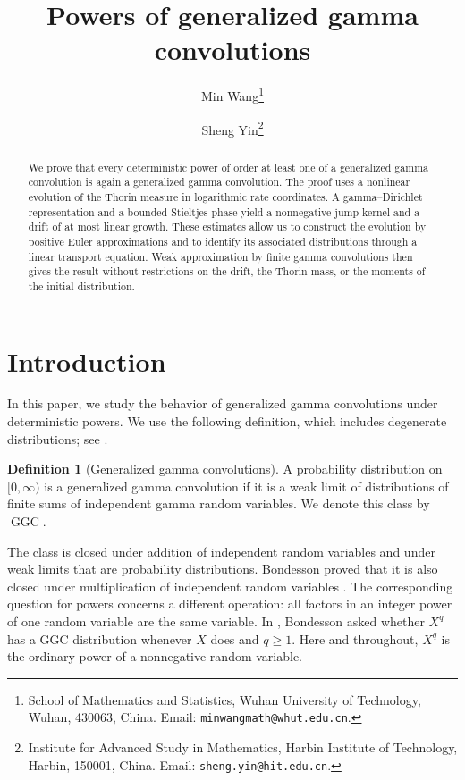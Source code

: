 \documentclass[11pt]{article}
\title{Powers of generalized gamma convolutions}
\author{Min Wang\thanks{School of Mathematics and Statistics, Wuhan University of Technology, Wuhan, 430063, China.
Email: \texttt{minwangmath@whut.edu.cn}.}
\and Sheng Yin\thanks{Institute for Advanced Study in Mathematics, Harbin Institute of Technology, Harbin, 150001, China.
Email: \texttt{sheng.yin@hit.edu.cn}.}}
\theoremstyle{definition}
\newtheorem{definition}{Definition}
\theoremstyle{remark}
\newcommand{\GGC}{\operatorname{GGC}}
\begin{document}
\maketitle

\begin{abstract}
We prove that every deterministic power of order at least one of a generalized gamma convolution is again a generalized gamma convolution.
The proof uses a nonlinear evolution of the Thorin measure in logarithmic rate coordinates.
A gamma--Dirichlet representation and a bounded Stieltjes phase yield a nonnegative jump kernel and a drift of at most linear growth.
These estimates allow us to construct the evolution by positive Euler approximations and to identify its associated distributions through a linear transport equation.
Weak approximation by finite gamma convolutions then gives the result without restrictions on the drift, the Thorin mass, or the moments of the initial distribution.
\end{abstract}

\section{Introduction}
\label{sec:introduction}

In this paper, we study the behavior of generalized gamma convolutions under deterministic powers.
We use the following definition, which includes degenerate distributions; see \cite[Section~3.1]{Bondesson1992}.

\begin{definition}[Generalized gamma convolutions]
\label{def:ggc}
A probability distribution on $[0,\infty)$ is a generalized gamma convolution if it is a weak limit of distributions of finite sums of independent gamma random variables.
We denote this class by $\GGC$.
\end{definition}

The class is closed under addition of independent random variables and under weak limits that are probability distributions.
Bondesson proved that it is also closed under multiplication of independent random variables \cite[Theorem~1]{Bondesson2015}.
The corresponding question for powers concerns a different operation: all factors in an integer power of one random variable are the same variable.
In \cite[Conjecture~1, p.~1075]{Bondesson2015}, Bondesson asked whether $X^q$ has a GGC distribution whenever $X$ does and $q\ge1$.
Here and throughout, $X^q$ is the ordinary power of a nonnegative random variable.
\end{document}
